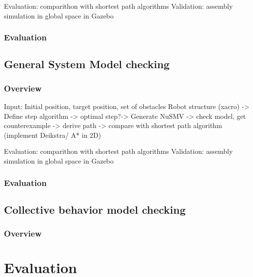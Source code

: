 Evaluation: comparithon with shortest path algorithms
Validation: assembly simulation in global space in Gazebo
\subsection{Evaluation}




\section{General System Model checking }

\subsection{Overview}
Input: Initial position, target position, set of obstacles
Robot structure (xacro) -> Define step algorithm -> optimal step?-> Generate NuSMV -> check model, get counterexample -> 
derive path -> compare with shortest path algorithm (implement Deikstra/ A* in 2D)

Evaluation: comparithon with shortest path algorithms
Validation: assembly simulation in global space in Gazebo
\subsection{Evaluation}

\section{Collective behavior model checking}

\subsection{Overview}


\chapter{Evaluation}
